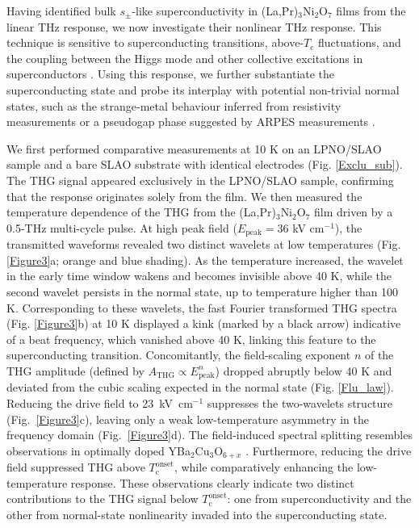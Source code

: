 \documentclass{nature}
\begin{document}
\vspace{18pt}

Having identified bulk $s_{\pm}$-like superconductivity in (La,Pr)$_3$Ni$_2$O$_7$ films from the linear THz response, we now investigate their nonlinear THz response. This technique is sensitive to superconducting transitions, above-$T_\mathrm{c}$ fluctuations, and the coupling between the Higgs mode and other collective excitations in superconductors \cite{Matsunaga2014,Matsunaga2013,Matsunaga2012,Kovalev2021,Wang2022,Yuan2024,Chu2023,Kim2024}. Using this response, we further substantiate the superconducting state and probe its interplay with potential non-trivial normal states, such as the strange‑metal behaviour inferred from resistivity measurements \cite{Zhang2024high} or a pseudogap phase suggested by ARPES measurements \cite{shen2025LPSNO}.

We first performed comparative measurements at 10 K on an LPNO/SLAO sample and a bare SLAO substrate with identical electrodes (Fig. \ref{Exclu_sub}). The THG signal appeared exclusively in the LPNO/SLAO sample, confirming that the response originates solely from the film. We then measured the temperature dependence of the THG from the (La,Pr)$_3$Ni$_2$O$_7$ film driven by a 0.5-THz multi-cycle pulse. At high peak field ($E_{\text{peak}} = 36$ kV cm$^{-1}$), the transmitted waveforms revealed two distinct wavelets at low temperatures (Fig. \ref{Figure3}a; orange and blue shading). As the temperature increased, the wavelet in the early time window wakens and becomes invisible above 40 K, while the second wavelet persists in the normal state, up to temperature higher than 100 K. Corresponding to these wavelets, the fast Fourier transformed THG spectra (Fig. \ref{Figure3}b) at 10 K displayed a kink (marked by a black arrow) indicative of a beat frequency, which vanished above 40 K, linking this feature to the superconducting transition. Concomitantly, the field-scaling exponent $n$ of the THG amplitude (defined by $A_{\text{THG}} \propto E_{\text{peak}}^n$) dropped abruptly below 40 K and deviated from the cubic scaling expected in the normal state (Fig. \ref{Flu_law}). Reducing the drive field to 23 kV cm$^{-1}$ suppresses the two-wavelets structure (Fig. \ref{Figure3}c), leaving only a weak low-temperature asymmetry in the frequency domain (Fig. \ref{Figure3}d). The field-induced spectral splitting resembles observations in optimally doped YBa$_2$Cu$_3$O$_{6+x}$ \cite{Yuan2024}. Furthermore, reducing the drive field suppressed THG above $T_\mathrm{c}^{\mathrm{onset}}$, while comparatively enhancing the low-temperature response. These observations clearly indicate two distinct contributions to the THG signal below $T_\mathrm{c}^{\mathrm{onset}}$: one from superconductivity and the other from normal-state nonlinearity invaded into the superconducting state. 
\end{document}
